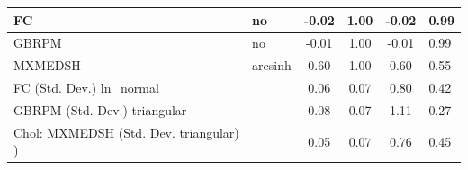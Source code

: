 \begin{table}
\begin{center}
\begin{tabular}{|l|l|c|c|c|l|}
			\hline
			FC & no & -0.02 & 1.00 & -0.02 & 0.99 \\
			\hline
			GBRPM & no & -0.01 & 1.00 & -0.01 & 0.99 \\
			\hline
			MXMEDSH & arcsinh & 0.60 & 1.00 & 0.60 & 0.55 \\
			\hline
			FC (Std. Dev.) ln_normal &  & 0.06 & 0.07 & 0.80 & 0.42 \\
			\hline
			GBRPM (Std. Dev.) triangular &  & 0.08 & 0.07 & 1.11 & 0.27 \\
			\hline
			 Chol: MXMEDSH (Std. Dev. triangular) ) &  & 0.05 & 0.07 & 0.76 & 0.45 \\
			\hline
		\end{tabular}
	\end{center}
\end{table}